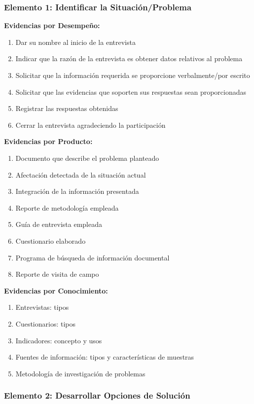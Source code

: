 \documentclass[12pt,letterpaper,oneside]{book}
\begin{document}
\subsubsection{Elemento 1: Identificar la Situación/Problema}

\textbf{Evidencias por Desempeño:}
\begin{enumerate}
\item Dar su nombre al inicio de la entrevista
\item Indicar que la razón de la entrevista es obtener datos relativos al problema
\item Solicitar que la información requerida se proporcione verbalmente/por escrito
\item Solicitar que las evidencias que soporten sus respuestas sean proporcionadas
\item Registrar las respuestas obtenidas
\item Cerrar la entrevista agradeciendo la participación
\end{enumerate}

\textbf{Evidencias por Producto:}
\begin{enumerate}
\item Documento que describe el problema planteado
\item Afectación detectada de la situación actual
\item Integración de la información presentada
\item Reporte de metodología empleada
\item Guía de entrevista empleada
\item Cuestionario elaborado
\item Programa de búsqueda de información documental
\item Reporte de visita de campo
\end{enumerate}

\textbf{Evidencias por Conocimiento:}
\begin{enumerate}
\item Entrevistas: tipos
\item Cuestionarios: tipos
\item Indicadores: concepto y usos
\item Fuentes de información: tipos y características de muestras
\item Metodología de investigación de problemas
\end{enumerate}

\subsubsection{Elemento 2: Desarrollar Opciones de Solución}
\end{document}
